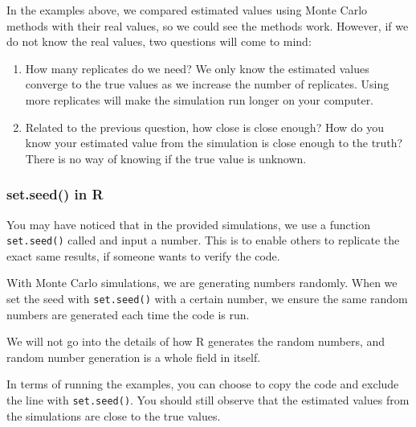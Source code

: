 \documentclass[
]{book}
\begin{document}
In the examples above, we compared estimated values using Monte Carlo methods with their real values, so we could see the methods work. However, if we do not know the real values, two questions will come to mind:

\begin{enumerate}
\def\labelenumi{\arabic{enumi}.}
\item
  How many replicates do we need? We only know the estimated values converge to the true values as we increase the number of replicates. Using more replicates will make the simulation run longer on your computer.
\item
  Related to the previous question, how close is close enough? How do you know your estimated value from the simulation is close enough to the truth? There is no way of knowing if the true value is unknown.
\end{enumerate}

\subsubsection{set.seed() in R}\label{set.seed-in-r}

You may have noticed that in the provided simulations, we use a function \texttt{set.seed()} called and input a number. This is to enable others to replicate the exact same results, if someone wants to verify the code.

With Monte Carlo simulations, we are generating numbers randomly. When we set the seed with \texttt{set.seed()} with a certain number, we ensure the same random numbers are generated each time the code is run.

We will not go into the details of how R generates the random numbers, and random number generation is a whole field in itself.

In terms of running the examples, you can choose to copy the code and exclude the line with \texttt{set.seed()}. You should still observe that the estimated values from the simulations are close to the true values.

  
\end{document}
